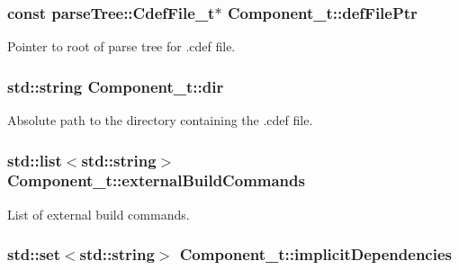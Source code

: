\subsubsection[{\texorpdfstring{def\+File\+Ptr}{defFilePtr}}]{\setlength{\rightskip}{0pt plus 5cm}const {\bf parse\+Tree\+::\+Cdef\+File\+\_\+t}$\ast$ Component\+\_\+t\+::def\+File\+Ptr}\hypertarget{struct_component__t_a911ea1486e0793950d25f8a67ff28408}{}\label{struct_component__t_a911ea1486e0793950d25f8a67ff28408}


Pointer to root of parse tree for .cdef file. 

\subsubsection[{\texorpdfstring{dir}{dir}}]{\setlength{\rightskip}{0pt plus 5cm}std\+::string Component\+\_\+t\+::dir}\hypertarget{struct_component__t_ad9b96c9fe0ba63452b38722e57d01c2c}{}\label{struct_component__t_ad9b96c9fe0ba63452b38722e57d01c2c}


Absolute path to the directory containing the .cdef file. 

\subsubsection[{\texorpdfstring{external\+Build\+Commands}{externalBuildCommands}}]{\setlength{\rightskip}{0pt plus 5cm}std\+::list$<$std\+::string$>$ Component\+\_\+t\+::external\+Build\+Commands}\hypertarget{struct_component__t_a9334c55b61e6e7dba65405ede7b2f338}{}\label{struct_component__t_a9334c55b61e6e7dba65405ede7b2f338}


List of external build commands. 

\subsubsection[{\texorpdfstring{implicit\+Dependencies}{implicitDependencies}}]{\setlength{\rightskip}{0pt plus 5cm}std\+::set$<$std\+::string$>$ Component\+\_\+t\+::implicit\+Dependencies}\hypertarget{struct_component__t_a9607f8052fd14e39bd41c9e84ca9358c}{}\label{struct_component__t_a9607f8052fd14e39bd41c9e84ca9358c}


